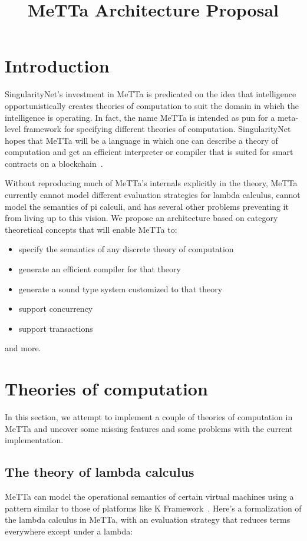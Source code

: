 \documentclass{article}
\title{MeTTa Architecture Proposal}
\author{}
\date{}
\begin{document}
\maketitle

\section{Introduction}

SingularityNet's investment in MeTTa is predicated on the idea that intelligence opportunistically creates theories of computation to suit the domain in which the intelligence is operating.  In fact, the name MeTTa is intended as pun for a meta-level framework for specifying different theories of computation.  SingularityNet hopes that MeTTa will be a language in which one can describe a theory of computation and get an efficient interpreter or compiler that is suited for smart contracts on a blockchain~\cite{GoertzelMeredith2024}.

Without reproducing much of MeTTa's internals explicitly in the theory, MeTTa currently cannot model different evaluation strategies for lambda calculus, cannot model the semantics of pi calculi, and has several other problems preventing it from living up to this vision.  We propose an architecture based on category theoretical concepts that will enable MeTTa to:
\begin{itemize}
    \item specify the semantics of any discrete theory of computation
    \item generate an efficient compiler for that theory
    \item generate a sound type system customized to that theory
    \item support concurrency
    \item support transactions
\end{itemize}
and more.

\section{Theories of computation}

In this section, we attempt to implement a couple of theories of computation in MeTTa and uncover some missing features and some problems with the current implementation.

\subsection{The theory of lambda calculus}
MeTTa can model the operational semantics of certain virtual machines using a pattern similar to those of platforms like K Framework~\cite{kframework}.  Here's a formalization of the lambda calculus in MeTTa, with an evaluation strategy that reduces terms everywhere except under a lambda:
\end{document}
